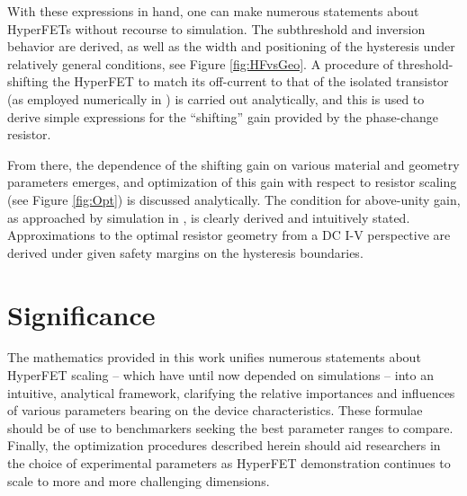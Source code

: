 \begin{multicols}{2}
With these expressions in hand, one can make numerous statements about HyperFETs without recourse to simulation.  The subthreshold and inversion behavior are derived, as well as the width and positioning of the hysteresis under relatively general conditions, see Figure \ref{fig:HFvsGeo}.  A procedure of threshold-shifting the HyperFET to match its off-current to that of the isolated transistor (as employed numerically in \cite{Shukla_2015, Frougier_2016}) is carried out analytically, and this is used to derive simple expressions for the ``shifting'' gain provided by the phase-change resistor. 

From there, the dependence of the shifting gain on various material and geometry parameters emerges, and optimization of this gain with respect to resistor scaling (see Figure \ref{fig:Opt}) is discussed analytically.  The condition for above-unity gain, as approached by simulation in \cite{Frougier_2016}, is clearly derived and intuitively stated.  Approximations to the optimal resistor geometry from a DC I-V perspective are derived under given safety margins on the hysteresis boundaries.

\section*{Significance}
The mathematics provided in this work unifies numerous statements about HyperFET scaling -- which have until now depended on simulations -- into an intuitive, analytical framework, clarifying the relative importances and influences of various parameters bearing on the device characteristics.  These formulae should be of use to benchmarkers seeking the best parameter ranges to compare. Finally, the optimization procedures described herein should aid researchers in the choice of experimental parameters as HyperFET demonstration continues to scale to more and more challenging dimensions.


\ifdoublecol\end{multicols}\fi

\vfill


